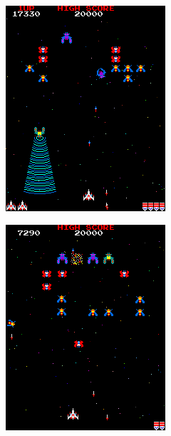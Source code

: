 \documentclass[12pt,a4paper]{report}
\begin{document}
\begin{figure}[bt]
\begin{subfigure}{.32\textwidth}
  \includegraphics[width=.95\linewidth]{snapshot2}
  \caption{}
  \label{fig:snap2}
\end{subfigure}%
\begin{subfigure}{.32\textwidth}
  \centering
  \includegraphics[width=.95\linewidth]{snapshot3}

\end{subfigure}
\end{figure}
\end{document}
